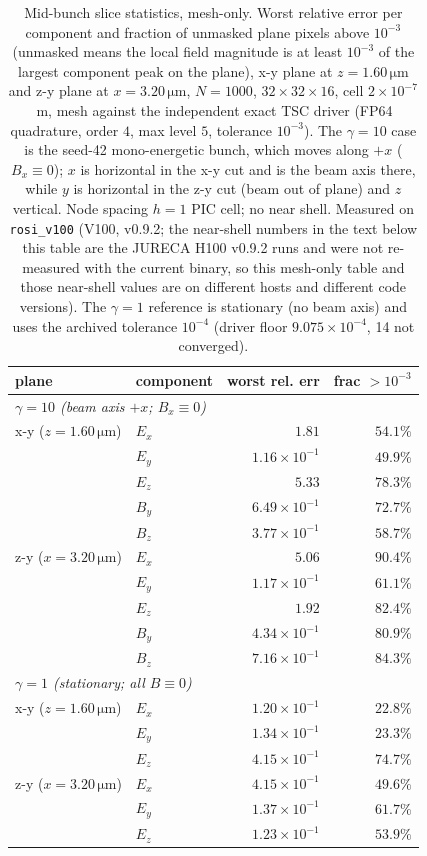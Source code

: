 \begin{table}[t]
\centering
\small
\caption{Mid-bunch slice statistics, mesh-only. Worst relative error per
component and fraction of unmasked plane pixels above $10^{-3}$ (unmasked
means the local field magnitude is at least $10^{-3}$ of the largest
component peak on the plane), x-y plane
at $z=1.60\,\si{\micro\metre}$ and z-y plane at $x=3.20\,\si{\micro\metre}$,
$N=1000$, $32\times32\times16$, cell $2\times10^{-7}$\,m, mesh against the
independent exact TSC driver (FP64 quadrature, order $4$, max level $5$,
tolerance $10^{-3}$). The $\gamma=10$ case is the seed-42 mono-energetic
bunch, which moves along $+x$ ($B_x\equiv0$);
$x$ is horizontal in the x-y cut and is the beam axis there, while $y$ is
horizontal in the z-y cut (beam out of plane) and $z$ vertical. Node spacing $h=1$ PIC cell; no near shell.
Measured on \texttt{rosi\_v100} (V100, v0.9.2; the near-shell numbers in
the text below this table are the JURECA H100 v0.9.2 runs and were not
re-measured with the current binary, so this mesh-only table and those
near-shell values are on different hosts and different code versions).
The $\gamma=1$ reference is stationary (no beam axis) and uses the archived
tolerance $10^{-4}$ (driver floor $9.075\times10^{-4}$, 14 not converged).}
\label{tab:slices}
\begin{tabular}{llrr}
\toprule
plane & component & worst rel. err & frac $>10^{-3}$ \\
\midrule
\multicolumn{4}{l}{\emph{$\gamma=10$ (beam axis $+x$; $B_x\equiv0$)}} \\
x-y ($z\!=\!1.60\,\si{\micro\metre}$) & $E_x$ & $1.81$ & $54.1\%$ \\
 & $E_y$ & $1.16\times10^{-1}$ & $49.9\%$ \\
 & $E_z$ & $5.33$ & $78.3\%$ \\
 & $B_y$ & $6.49\times10^{-1}$ & $72.7\%$ \\
 & $B_z$ & $3.77\times10^{-1}$ & $58.7\%$ \\
z-y ($x\!=\!3.20\,\si{\micro\metre}$) & $E_x$ & $5.06$ & $90.4\%$ \\
 & $E_y$ & $1.17\times10^{-1}$ & $61.1\%$ \\
 & $E_z$ & $1.92$ & $82.4\%$ \\
 & $B_y$ & $4.34\times10^{-1}$ & $80.9\%$ \\
 & $B_z$ & $7.16\times10^{-1}$ & $84.3\%$ \\
\midrule
\multicolumn{4}{l}{\emph{$\gamma=1$ (stationary; all $B\equiv0$)}} \\
x-y ($z\!=\!1.60\,\si{\micro\metre}$) & $E_x$ & $1.20\times10^{-1}$ & $22.8\%$ \\
 & $E_y$ & $1.34\times10^{-1}$ & $23.3\%$ \\
 & $E_z$ & $4.15\times10^{-1}$ & $74.7\%$ \\
z-y ($x\!=\!3.20\,\si{\micro\metre}$) & $E_x$ & $4.15\times10^{-1}$ & $49.6\%$ \\
 & $E_y$ & $1.37\times10^{-1}$ & $61.7\%$ \\
 & $E_z$ & $1.23\times10^{-1}$ & $53.9\%$ \\
\bottomrule
\end{tabular}
\end{table}

